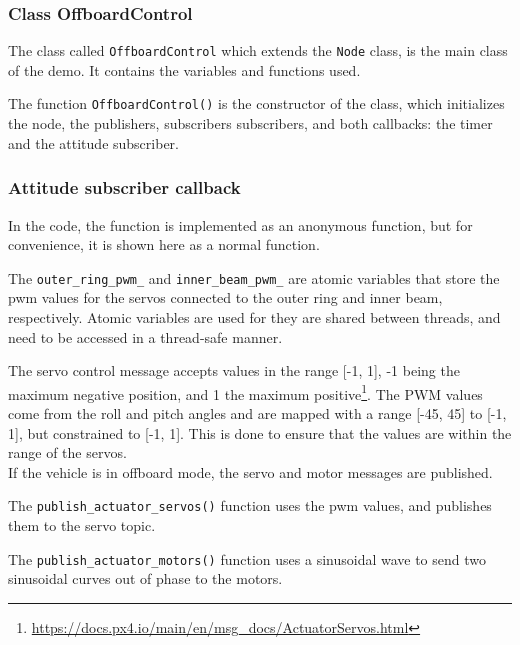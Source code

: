 \documentclass[a4paper]{article}
\begin{document}
\subsubsection{Class OffboardControl}

The class called \verb|OffboardControl| which extends the \verb|Node| class, is the main class of the demo. 
It contains the variables and functions used. 

The function \verb|OffboardControl()| is the constructor of the class, which initializes the node, the publishers, subscribers subscribers, and both callbacks: the timer and the attitude subscriber.



\subsubsection{Attitude subscriber callback}

In the code, the function is implemented as an anonymous function, but for convenience, it is shown here as a normal function.



The \verb|outer_ring_pwm_| and \verb|inner_beam_pwm_| are atomic variables that store the pwm values for the servos connected to the outer ring and inner beam, respectively. 
Atomic variables are used for they are shared between threads, and need to be accessed in a thread-safe manner. 

The servo control message accepts values in the range [-1, 1], -1 being the maximum negative position, and 1 the maximum positive\footnote{\url{https://docs.px4.io/main/en/msg_docs/ActuatorServos.html}}. 
The PWM values come from the roll and pitch angles and are mapped with a range [-45, 45] to [-1, 1], but constrained to [-1, 1]. 
This is done to ensure that the values are within the range of the servos. \\

If the vehicle is in offboard mode, the servo and motor messages are published. 

The \verb|publish_actuator_servos()| function uses the pwm values, and publishes them to the servo topic. 

The \verb|publish_actuator_motors()| function uses a sinusoidal wave to send two sinusoidal curves out of phase to the motors. 
\end{document}
